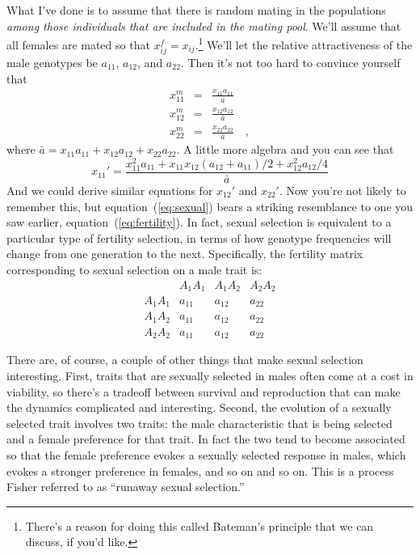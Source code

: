 \documentclass[12pt]{article}
\begin{document}
What I've done is to assume that there is random mating in the
populations {\it among those individuals that are included in the
mating pool}. We'll assume that all females are mated so that
$x_{ij}^f = x_{ij}$.\footnote{There's a reason for doing this called
Bateman's principle that we can discuss, if you'd like.} We'll let the
relative attractiveness of the male genotypes be $a_{11}$, $a_{12}$,
and $a_{22}$. Then it's not too hard to convince yourself that
\begin{eqnarray*}
x_{11}^m &=& \frac{x_{11}a_{11}}{\bar a} \\
x_{12}^m &=& \frac{x_{12}a_{12}}{\bar a} \\
x_{22}^m &=& \frac{x_{22}a_{22}}{\bar a} \quad ,
\end{eqnarray*}
where $\bar a = x_{11}a_{11} + x_{12}a_{12} + x_{22}a_{22}$. A little
more algebra and you can see that
\begin{equation}
x_{11}' = \frac{x_{11}^2a_{11} + x_{11}x_{12}(a_{12} + a_{11})/2
                + x_{12}^2a_{12}/4}{\bar a} \label{eq:sexual}
\end{equation}
And we could derive similar equations for $x_{12}'$ and $x_{22}'$. Now
you're not likely to remember this, but equation~(\ref{eq:sexual})
bears a striking resemblance to one you saw earlier,
equation~(\ref{eq:fertility}). In fact, sexual selection is equivalent
to a particular type of fertility selection, in terms of how genotype
frequencies will change from one generation to the next. Specifically,
the fertility matrix corresponding to sexual selection on a male trait
is:
\[
\begin{array}{cccc}
         & A_1A_1 & A_1A_2 & A_2A_2 \\
A_1A_1 & a_{11} & a_{12} & a_{22} \\
A_1A_2 & a_{11} & a_{12} & a_{22} \\
A_2A_2 & a_{11} & a_{12} & a_{22}
\end{array}
\]

There are, of course, a couple of other things that make sexual
selection interesting. First, traits that are sexually selected in
males often come at a cost in viability, so there's a tradeoff between
survival and reproduction that can make the dynamics complicated and
interesting. Second, the evolution of a sexually selected trait
involves two traits: the male characteristic that is being selected
and a female preference for that trait. In fact the two tend to become
associated so that the female preference evokes a sexually selected
response in males, which evokes a stronger preference in females, and
so on and so on. This is a process Fisher referred to as ``runaway
sexual selection.''

\ccLicense
\end{document}
